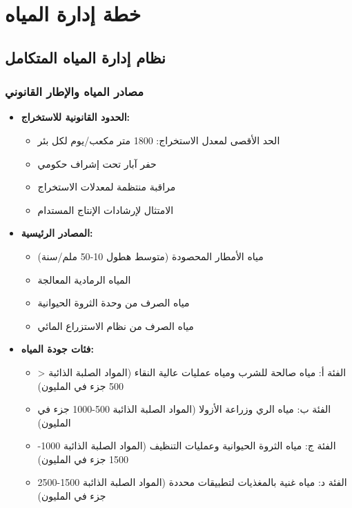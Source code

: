 \section{خطة إدارة المياه}

\subsection{نظام إدارة المياه المتكامل}

\subsubsection{مصادر المياه والإطار القانوني}
\begin{itemize}
    \item \textbf{الحدود القانونية للاستخراج:}
    \begin{itemize}
        \item الحد الأقصى لمعدل الاستخراج: 1800 متر مكعب/يوم لكل بئر
        \item حفر آبار تحت إشراف حكومي
        \item مراقبة منتظمة لمعدلات الاستخراج
        \item الامتثال لإرشادات الإنتاج المستدام
    \end{itemize}
    
    \item \textbf{المصادر الرئيسية:}
    \begin{itemize}
        \item مياه الأمطار المحصودة (متوسط هطول 10-50 ملم/سنة)
        \item المياه الرمادية المعالجة
        \item مياه الصرف من وحدة الثروة الحيوانية
        \item مياه الصرف من نظام الاستزراع المائي
    \end{itemize}
    
    \item \textbf{فئات جودة المياه:}
    \begin{itemize}
        \item الفئة أ: مياه صالحة للشرب ومياه عمليات عالية النقاء (المواد الصلبة الذائبة < 500 جزء في المليون)
        \item الفئة ب: مياه الري وزراعة الأزولا (المواد الصلبة الذائبة 500-1000 جزء في المليون)
        \item الفئة ج: مياه الثروة الحيوانية وعمليات التنظيف (المواد الصلبة الذائبة 1000-1500 جزء في المليون)
        \item الفئة د: مياه غنية بالمغذيات لتطبيقات محددة (المواد الصلبة الذائبة 1500-2500 جزء في المليون)
    \end{itemize}
\end{itemize}

